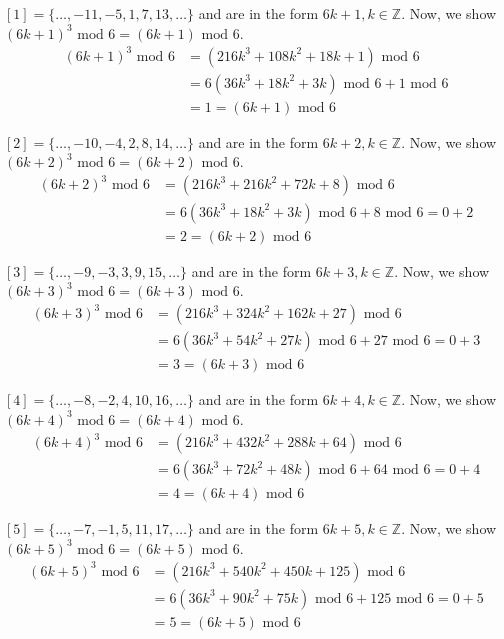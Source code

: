 \documentclass[12pt]{article}
\begin{document}
\begin{enumerate}
\begin{enumerate}
$[1] = \{\ldots, -11, -5, 1, 7, 13, \ldots\}$ and are in the form $6k + 1, k \in \mathbb{Z}$.
Now, we show $(6k + 1)^3\mbox{ mod } 6 = (6k + 1)\mbox{ mod } 6$. 
\begin{align*}
(6k + 1)^3\mbox{ mod } 6 &= (216k^3 + 108k^2 + 18k + 1)\mbox{ mod } 6 \\
&= 6(36k^3 + 18k^2 + 3k)\mbox{ mod } 6 + 1\mbox{ mod } 6 \\
&= 1 = (6k + 1)\mbox{ mod } 6
\end{align*}

$[2] = \{\ldots, -10, -4, 2, 8, 14, \ldots\}$ and are in the form $6k + 2, k \in \mathbb{Z}$.
Now, we show $(6k + 2)^3\mbox{ mod } 6 = (6k + 2)\mbox{ mod } 6$. 
\begin{align*}
(6k + 2)^3\mbox{ mod } 6 &= (216k^3 + 216k^2 + 72k + 8)\mbox{ mod } 6 \\
&= 6(36k^3 + 18k^2 + 3k)\mbox{ mod } 6 + 8\mbox{ mod } 6 = 0 + 2 \\
&= 2 = (6k + 2)\mbox{ mod } 6
\end{align*}

$[3] = \{\ldots, -9, -3, 3, 9, 15, \ldots\}$ and are in the form $6k + 3, k \in \mathbb{Z}$.
Now, we show $(6k + 3)^3\mbox{ mod } 6 = (6k + 3)\mbox{ mod } 6$. 
\begin{align*}
(6k + 3)^3\mbox{ mod } 6 &= (216k^3 + 324k^2 + 162k + 27)\mbox{ mod } 6 \\
&= 6(36k^3 + 54k^2 + 27k)\mbox{ mod } 6 + 27\mbox{ mod } 6 = 0 + 3 \\
&= 3 = (6k + 3)\mbox{ mod } 6
\end{align*}

$[4] = \{\ldots, -8, -2, 4, 10, 16, \ldots\}$ and are in the form $6k + 4, k \in \mathbb{Z}$.
Now, we show $(6k + 4)^3\mbox{ mod } 6 = (6k + 4)\mbox{ mod } 6$. 
\begin{align*}
(6k + 4)^3\mbox{ mod } 6 &= (216k^3 + 432k^2 + 288k + 64)\mbox{ mod } 6 \\
&= 6(36k^3 + 72k^2 + 48k)\mbox{ mod } 6 + 64\mbox{ mod } 6 = 0 + 4 \\
&= 4 = (6k + 4)\mbox{ mod } 6
\end{align*}

$[5] = \{\ldots, -7, -1, 5, 11, 17, \ldots\}$ and are in the form $6k + 5, k \in \mathbb{Z}$.
Now, we show $(6k + 5)^3\mbox{ mod } 6 = (6k + 5)\mbox{ mod } 6$. 
\begin{align*}
(6k + 5)^3\mbox{ mod } 6 &= (216k^3 + 540k^2 + 450k + 125)\mbox{ mod } 6 \\
&= 6(36k^3 + 90k^2 + 75k)\mbox{ mod } 6 + 125\mbox{ mod } 6 = 0 + 5 \\
&= 5 = (6k + 5)\mbox{ mod } 6
\end{align*}


\end{enumerate}
\end{enumerate}
\end{document}
